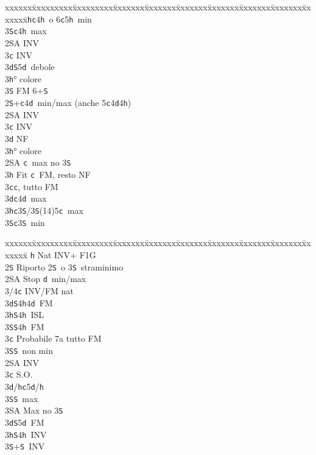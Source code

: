\documentclass[a4paper,italian]{article}
\newcommand{\BS}{\small{\texttt{S}}}
\newcommand{\BC}{\small{\texttt{c}}}
\newcommand{\BD}{\small{\texttt{d}}}
\newcommand{\BH}{\small{\texttt{h}}}
\newenvironment{bidtable}
{\begin{tabbing}

    xxxxxx\=xxxxxxxxx\=xxxxxxxxx\=xxxxxxx\=xxxxxxx\=xxxxxxx\=xxxxxxx\=xxxxxxx\=xxxxxxx\=xxxxxxx\=\kill}
{\end{tabbing} }%
\begin{document}
\begin{multicols}{2}
\begin{bidtable}
        3\BH {}\BC 4\BH\ o 6\BC 5\BH\ min\\
        3\BS {}\BC 4\BH\ max\-\\
        2\small{SA} \> INV\\
        3\BC \> INV\\
        3\BD {}\BS 5\BD\ debole\\
        3\BH {}° colore\\
        3\BS \> FM 6+\BS\-\\
        2\BS {}+\BC 4\BD\ min/max (anche 5\BC 4\BD 4\BH )\+\\
        2\small{SA} \> INV\\
        3\BC \> INV\\
        3\BD \> NF\\
        3\BH {}° colore\-\\
        2\small{SA} \BC\ max no 3\BS \+\\
        3\BH \> Fit \BC\ FM, resto NF\-\\
        3\BC {}\BC , tutto FM\\
        3\BD {}\BC 4\BD\ max\\
        3\BH {}\BC 3\BS /3\BS (14)5\BC\ max\\
        3\BS {}\BC 3\BS\ min
    \end{bidtable}
    \vfill\null
    \columnbreak
    \begin{bidtable}
        \BH \> Nat INV+ F1G\+\+\\
        2\BS \> Riporto 2\BS\ o 3\BS\ straminimo\\
        2\small{SA} \> Stop \BD\ min/max\+\\
        3/4\BC \> INV/FM nat\\
        3\BD {}\BS 4\BH 4\BD\ FM\\
        3\BH {}\BS 4\BH\ ISL\\
        3\BS {}\BS 4\BH\ FM\-\\
        3\BC \> Probabile 7a tutto FM\\
        3\BS {}\BS\ non min\-\\
        2\small{SA} \> INV\+\\
        3\BC \> S.O.\\
        3\BD/\BH {}\BC 5\BD /\BH \\
        3\BS {}\BS\ max\\
        3\small{SA} \> Max no 3\BS \-\\
        3\BD {}\BS 5\BD\ FM\\
        3\BH {}\BS 4\BH\ INV\\
        3\BS {}+\BS\ INV\-\\
    \end{bidtable}


\end{multicols}
\end{document}
